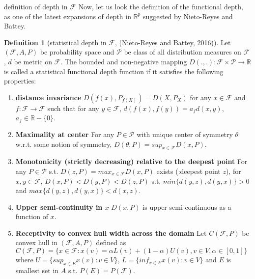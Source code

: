 \documentclass[aspectratio=169,ignorenonframetext,9pt]{beamer}
\theoremstyle{plain}
\theoremstyle{definition}
\newtheorem{defn}{Definition}[section]
\begin{document}
\begin{frame}{definition of depth in $\mathcal{F}$}
Now, let us look the definition of the functional depth, as one of the latest expansions of depth in $\mathbb{R}^p$ 
suggested by Nieto-Reyes and Battey.
\begin{defn}[statistical depth in $\mathcal{F}$, (Nieto-Reyes and Battey, 2016)]
    Let $(\mathcal{F},A,P)$ be probability space and $\mathcal{P}$ be class of all distribution measures on $\mathcal{F}$,
    $d$ be metric on $\mathcal{F}$.
    The bounded and non-negative mapping $D(.,.): \mathcal{F}\times \mathcal{P} \rightarrow \mathbb{R}$ is called
    a statistical functional depth function if it satisfies the following properties:
    \begin{enumerate}
        \item \textbf{distance invariance}
            $D(f(x),P_{f(X)})=D(X,P_X)$ for any $x\in\mathcal{F}$ and $f:\mathcal{F}\rightarrow\mathcal{F}$
            such that for any $y\in\mathcal{F}$, $d(f(x),f(y))=a_fd(x,y)$, $a_f\in\mathbb{R}-\{0\}$.
        \item \textbf{Maximality at center}
            For any $P\in\mathcal{P}$ with unique center of symmetry 
            $\theta$ w.r.t. some notion of symmetry, 
            $D(\theta,P)=sup_{x\in\mathcal{F}}D(x,P)$.
        \item \textbf{Monotonicity (strictly decreasing) relative to the deepest point}
            For any $P \in \mathcal{P}$ s.t. $D(z,P)=max_{x\in\mathcal{F}}D(x,P)$ exists (:deepest point $z$), 
            for $x,y\in\mathcal{F}$, $D(x,P)<D(y,P)<D(z,P)$ s.t. $min\{d(y,z),d(y,x)\}>0$ and $max\{d(y,z), d(y,x)\}<d(x,z)$.
        \item \textbf{Upper semi-continuity in $x$}
            $D(x,P)$ is upper semi-continuous as a function of $x$.
        \item \textbf{Receptivity to convex hull width across the domain}
            Let $C(\mathcal{F},P)$ be convex hull in $(\mathcal{F},A,P)$ defined as
            \(C(\mathcal{F},P)=\{x\in\mathcal{F} : x(v)=\alpha L(v)+ (1-\alpha)U(v), v\in V, \alpha\in[0,1]\}\)
            where $U=\{sup_{x\in E}x(v):v\in V\}$, $L=\{inf_{x\in E}x(v):v\in V\}$
            and $E$ is smallest set in $A$ s.t. $P(E)=P(\mathcal{F})$.


\end{enumerate}
\end{defn}
\end{frame}
\end{document}
